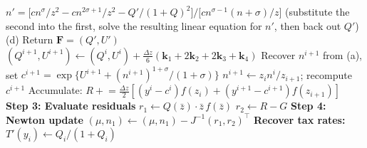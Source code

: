 \documentclass[12pt,a4paper]{article}
\theoremstyle{definition}
\theoremstyle{plain}
\theoremstyle{remark}
\newcommand{\zbar}{\bar{z}}
\begin{document}
\begin{algorithm}[H]
\begin{algorithmic}[1]
    \Statex \hspace{\algorithmicindent}\hspace{\algorithmicindent}\hspace{\algorithmicindent}\hspace{\algorithmicindent} $n' = \bigl[cn^{\sigma}/z^2 - cn^{2\sigma+1}/z^2 - Q'/(1+Q)^2\bigr] / \bigl[cn^{\sigma-1}(n+\sigma)/z\bigr]$
    \Statex \hspace{\algorithmicindent}\hspace{\algorithmicindent}\hspace{\algorithmicindent}\hspace{\algorithmicindent} (substitute the second into the first, solve the resulting linear equation for $n'$,
    \Statex \hspace{\algorithmicindent}\hspace{\algorithmicindent}\hspace{\algorithmicindent}\hspace{\algorithmicindent} then back out $Q'$)
    \Statex \hspace{\algorithmicindent}\hspace{\algorithmicindent}\hspace{\algorithmicindent} (d) Return $\mathbf{F} = (Q', U')$
    \State $(Q^{i+1}, U^{i+1}) \gets (Q^i, U^i) + \frac{\Delta z}{6}(\mathbf{k}_1 + 2\mathbf{k}_2 + 2\mathbf{k}_3 + \mathbf{k}_4)$
    \State Recover $n^{i+1}$ from (a), set $c^{i+1} = \exp\{U^{i+1} + (n^{i+1})^{1+\sigma}/(1+\sigma)\}$
     
      \State $n^{i+1} \gets z_i n^i / z_{i+1}$; recompute $c^{i+1}$ 
    \EndIf
    \State Accumulate: $R \mathrel{+}= \frac{\Delta z}{2}[(y^i - c^i)f(z_i) + (y^{i+1} - c^{i+1})f(z_{i+1})]$
  \EndFor
  \Statex
  \State \textbf{Step 3: Evaluate residuals}
  \Statex \hspace{\algorithmicindent}\hspace{\algorithmicindent} $r_1 \gets Q(\zbar) \cdot \zbar \, f(\zbar)$ 
  \Statex \hspace{\algorithmicindent}\hspace{\algorithmicindent} $r_2 \gets R - G$ 
  \Statex
  \State \textbf{Step 4: Newton update}
  \Statex \hspace{\algorithmicindent}\hspace{\algorithmicindent} $(\mu, n_1) \gets (\mu, n_1) - J^{-1}(r_1, r_2)^\top$ 
\Statex
\State \textbf{Recover tax rates:}
  \State $T'(y_i) \gets Q_i / (1 + Q_i)$
\EndFor
\end{algorithmic}
\end{algorithm}
\end{document}
